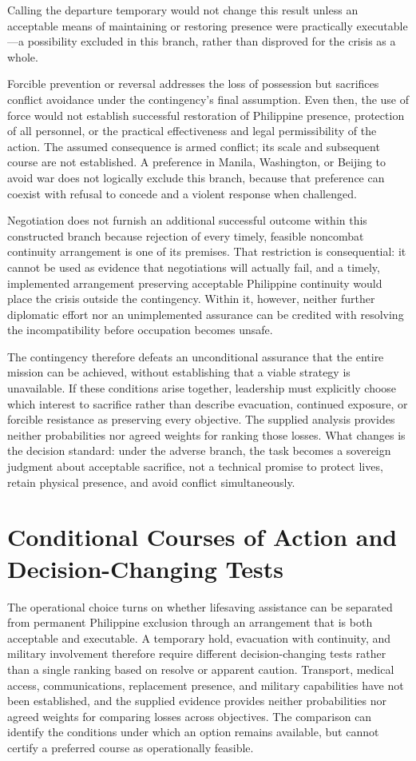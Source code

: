\documentclass[11pt]{article}
\begin{document}
Calling the departure temporary would not change this result unless an acceptable means of maintaining or restoring presence were practically executable—a possibility excluded in this branch, rather than disproved for the crisis as a whole.

Forcible prevention or reversal addresses the loss of possession but sacrifices conflict avoidance under the contingency’s final assumption. Even then, the use of force would not establish successful restoration of Philippine presence, protection of all personnel, or the practical effectiveness and legal permissibility of the action. The assumed consequence is armed conflict; its scale and subsequent course are not established. A preference in Manila, Washington, or Beijing to avoid war does not logically exclude this branch, because that preference can coexist with refusal to concede and a violent response when challenged.

Negotiation does not furnish an additional successful outcome within this constructed branch because rejection of every timely, feasible noncombat continuity arrangement is one of its premises. That restriction is consequential: it cannot be used as evidence that negotiations will actually fail, and a timely, implemented arrangement preserving acceptable Philippine continuity would place the crisis outside the contingency. Within it, however, neither further diplomatic effort nor an unimplemented assurance can be credited with resolving the incompatibility before occupation becomes unsafe.

The contingency therefore defeats an unconditional assurance that the entire mission can be achieved, without establishing that a viable strategy is unavailable. If these conditions arise together, leadership must explicitly choose which interest to sacrifice rather than describe evacuation, continued exposure, or forcible resistance as preserving every objective. The supplied analysis provides neither probabilities nor agreed weights for ranking those losses. What changes is the decision standard: under the adverse branch, the task becomes a sovereign judgment about acceptable sacrifice, not a technical promise to protect lives, retain physical presence, and avoid conflict simultaneously.

\section{Conditional Courses of Action and Decision-Changing Tests}
The operational choice turns on whether lifesaving assistance can be separated from permanent Philippine exclusion through an arrangement that is both acceptable and executable. A temporary hold, evacuation with continuity, and military involvement therefore require different decision-changing tests rather than a single ranking based on resolve or apparent caution. Transport, medical access, communications, replacement presence, and military capabilities have not been established, and the supplied evidence provides neither probabilities nor agreed weights for comparing losses across objectives. The comparison can identify the conditions under which an option remains available, but cannot certify a preferred course as operationally feasible.
\end{document}
